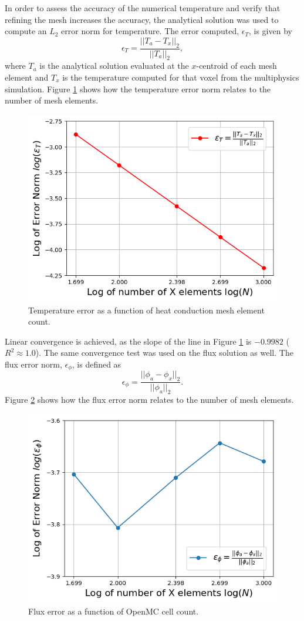 \documentclass[letterpaper]{mc2023}
\begin{document}
In order to assess the accuracy of the numerical temperature and verify that refining the mesh increases the accuracy, the analytical solution
was used to compute an $L_{2}$ error norm for temperature. The error computed, $\epsilon_{T}$, is given by
\begin{equation}
    \epsilon_{T} = \frac{|| T_{a} - T_{x} ||_{2}}{|| T_{a} ||_{2}},
\end{equation}
where $T_{a}$ is the analytical solution evaluated at the $x$-centroid of each mesh element and $T_{x}$ is the temperature computed for that
voxel from the multiphysics simulation. Figure \ref{fig:temp_error_study} shows how the temperature error norm relates to the number of mesh
elements.
\begin{figure}[H]
    \centering
    \includegraphics[width=0.5\linewidth]{figures/temp_error_norms.png}
    \caption{Temperature error as a function of heat conduction mesh element count.}
    \label{fig:temp_error_study}
\end{figure}
Linear convergence is achieved, as the slope of the line in Figure \ref{fig:temp_error_study} is $-0.9982$ ($R^2\approx1.0$). The same convergence test
was used on the flux solution as well. The flux error norm, $\epsilon_{\phi}$, is defined as
\begin{equation}
    \epsilon_{\phi} =  \frac{|| \phi_{a} - \phi_{x} ||_{2}}{|| \phi_{a} ||_{2}}.
\end{equation}
Figure \ref{fig:flux_error_study} shows how the flux error norm relates to the number of mesh elements.
\begin{figure}[H]
    \centering
    \includegraphics[width=0.45\linewidth]{figures/flux_error_norms.png}
    \caption{Flux error as a function of OpenMC cell count.}
    \label{fig:flux_error_study}
\end{figure}
\end{document}
